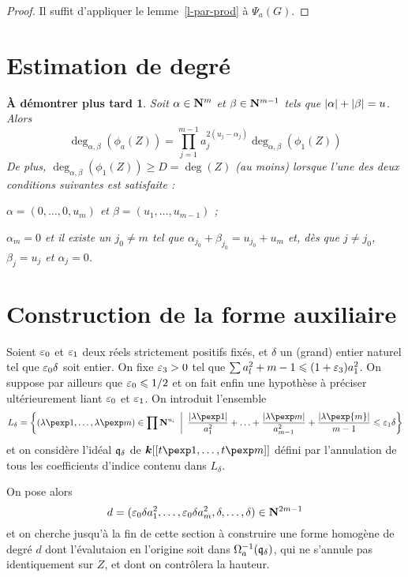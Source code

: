 \documentclass[11pt, twoside, a4paper]{article}
\newtheorem*{flemme}{À démontrer plus tard}
\theoremstyle{definition}
\begin{document}
\begin{proof}
  Il suffit d'appliquer le lemme~\ref{l-par-prod} à $\Psi_a(G)$.
\end{proof}

\section{Estimation de degré}

\begin{flemme}
  Soit $\alpha \in \mathbf{N}^m$ et $\beta \in \mathbf{N}^{m-1}$ tels que ${\lvert\alpha\rvert} +
  {\lvert\beta\rvert} = u$. Alors
  \[
    \deg_{\alpha, \beta}(\phi_a(Z))= \prod_{j=1}^{m-1} a_j^{2(u_j - \alpha_j)}
    \deg_{\alpha, \beta}(\phi_1(Z))
  \]
  De plus, $\deg_{\alpha, \beta}(\phi_1(Z)) \ge D = \deg(Z)$ (au moins) lorsque
  l'une des deux conditions suivantes est satisfaite :
  \begin{enumthm}
    \item $\alpha = (0, \ldots, 0, u_m)$ et $\beta = (u_1, \ldots, u_{m-1})$ ;
    \item $\alpha_m = 0$ et il existe un $j_0 \neq m$ tel que $\alpha_{j_0} +
      \beta_ {j_0} = u_{j_0} + u_m$ et, dès que $j \neq j_0$, $\beta_j = u_j$ et
      $\alpha_j = 0$.
  \end{enumthm}
\end{flemme}

\section{Construction de la forme auxiliaire}

Soient $\varepsilon_0$ et $\varepsilon_1$ deux réels strictement positifs fixés, et $\delta$
un (grand) entier naturel tel que $\varepsilon_0 \delta$ soit entier. On fixe $\varepsilon_3 >
0$ tel que $\sum a_l^2 + m -1 \leqslant (1 + \varepsilon_3) a_1^2$. On suppose par ailleurs
que $\varepsilon_0 \leqslant 1/2$ et on fait enfin une hypothèse à préciser ultérieurement
liant $\varepsilon_0$ et $\varepsilon_1$. On introduit l'ensemble 
\[
  L_\delta = \left\{ (\lambda\pexp 1, \ldots, \lambda\pexp m) \in \prod \N^{u_i}
  \,\suchthat\, 
  \frac{\lgr{\lambda\pexp1}}{a_1^2} + \ldots +
  \frac{\lgr{\lambda\pexp m}}{a_{m-1}^2} + \frac{\lgr{\lambda\pexp{m}}}{m-1} 
  \le \eps_1 \delta \right\}
\]
et on considère l'idéal ${\mathfrak q}_\delta$ de $\cdn[[t\pexp1, \ldots, t\pexp m]]$
défini par l'annulation de tous les coefficients d'indice contenu dans
$L_\delta$. 

On pose alors 
\[
  d = (\varepsilon_0\delta a_1^2, \ldots, \varepsilon_0\delta a_m^2, \delta, \ldots, \delta)
  \in \mathbf{N}^{2m-1}
\]
et on cherche jusqu'à la fin de cette section à construire une forme homogène de
degré $d$ dont l'évalutaion en l'origine soit dans $\Omega_a^{-1}({\mathfrak q}_\delta)$,
qui ne s'annule pas identiquement sur $Z$, et dont on contrôlera la hauteur.
\end{document}
